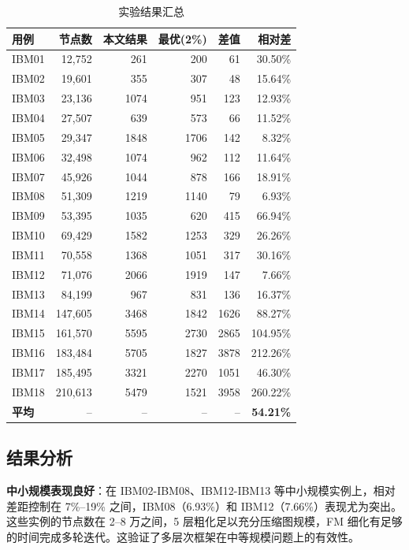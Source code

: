 \documentclass[journal, twocolumn]{IEEEtran}
\begin{document}
\begin{table}[htbp]
\centering
\caption{实验结果汇总}
\label{tab:results}
\footnotesize
\begin{tabular}{lrrrrr}
\toprule
\textbf{用例} & \textbf{节点数} & \textbf{本文结果} & \textbf{最优(2\%)} & \textbf{差值} & \textbf{相对差} \\
\midrule
IBM01 & 12,752 & 261 & 200 & 61 & 30.50\% \\
IBM02 & 19,601 & 355 & 307 & 48 & 15.64\% \\
IBM03 & 23,136 & 1074 & 951 & 123 & 12.93\% \\
IBM04 & 27,507 & 639 & 573 & 66 & 11.52\% \\
IBM05 & 29,347 & 1848 & 1706 & 142 & 8.32\% \\
IBM06 & 32,498 & 1074 & 962 & 112 & 11.64\% \\
IBM07 & 45,926 & 1044 & 878 & 166 & 18.91\% \\
IBM08 & 51,309 & 1219 & 1140 & 79 & 6.93\% \\
IBM09 & 53,395 & 1035 & 620 & 415 & 66.94\% \\
IBM10 & 69,429 & 1582 & 1253 & 329 & 26.26\% \\
IBM11 & 70,558 & 1368 & 1051 & 317 & 30.16\% \\
IBM12 & 71,076 & 2066 & 1919 & 147 & 7.66\% \\
IBM13 & 84,199 & 967 & 831 & 136 & 16.37\% \\
IBM14 & 147,605 & 3468 & 1842 & 1626 & 88.27\% \\
IBM15 & 161,570 & 5595 & 2730 & 2865 & 104.95\% \\
IBM16 & 183,484 & 5705 & 1827 & 3878 & 212.26\% \\
IBM17 & 185,495 & 3321 & 2270 & 1051 & 46.30\% \\
IBM18 & 210,613 & 5479 & 1521 & 3958 & 260.22\% \\
\midrule
\textbf{平均} & -- & -- & -- & -- & \textbf{54.21\%} \\
\bottomrule
\end{tabular}
\end{table}

\subsection{结果分析}

\textbf{中小规模表现良好}：在 IBM02-IBM08、IBM12-IBM13 等中小规模实例上，相对差距控制在 7\%--19\% 之间，IBM08（6.93\%）和 IBM12（7.66\%）表现尤为突出。这些实例的节点数在 2--8 万之间，5 层粗化足以充分压缩图规模，FM 细化有足够的时间完成多轮迭代。这验证了多层次框架在中等规模问题上的有效性。
\end{document}
